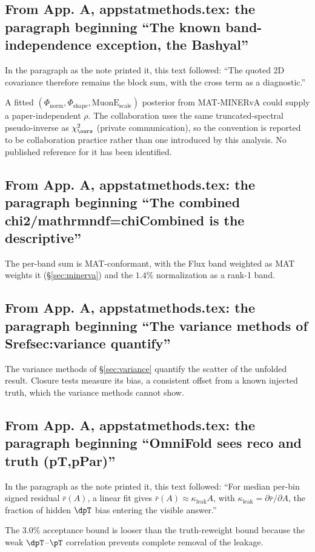 \subsection{From App. A, appstatmethods.tex: the paragraph beginning ``The known band-independence exception, the Bashyal''}
In the paragraph as the note printed it, this text followed: ``The quoted 2D covariance therefore remains the block sum, with the cross term as a diagnostic.''\par
A fitted $(\Phi_{\text{norm}},\Phi_{\text{shape}},\text{MuonE}_{\text{scale}})$ posterior from MAT-MINERvA could supply a paper-independent $\rho$. The collaboration uses the same truncated-spectral pseudo-inverse as $\chi^{2}_{\ours}$ (private communication), so the convention is reported to be collaboration practice rather than one introduced by this analysis. No published reference for it has been identified.

\subsection{From App. A, appstatmethods.tex: the paragraph beginning ``The combined chi2/mathrmndf=chiCombined is the descriptive''}
The per-band sum is MAT-conformant, with the Flux band weighted as MAT weights it (\S\ref{sec:minerva}) and the $1.4\%$ normalization as a rank-1 band.

\subsection{From App. A, appstatmethods.tex: the paragraph beginning ``The variance methods of Srefsec:variance quantify''}
The variance methods of \S\ref{sec:variance} quantify the scatter of the unfolded result. Closure tests measure its bias, a consistent offset from a known injected truth, which the variance methods cannot show.

\subsection{From App. A, appstatmethods.tex: the paragraph beginning ``OmniFold sees reco and truth (pT,pPar)''}
In the paragraph as the note printed it, this text followed: ``For median per-bin signed residual $\bar r(A)$, a linear fit gives $\bar r(A) \approx \kappa_{\text{leak}} A$, with $\kappa_{\text{leak}} = \partial \bar r/\partial A$, the fraction of hidden $\dpT$ bias entering the visible answer.''\par
The $3.0\%$ acceptance bound is looser than the truth-reweight bound because the weak $\dpT$--$\pT$ correlation prevents complete removal of the leakage.

